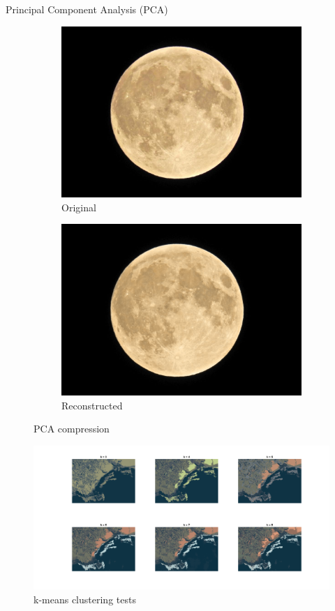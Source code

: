 Principal Component Analysis (PCA)
\begin{figure}[!ht]
    \centering
    \begin{subfigure}{0.45\textwidth}
    \centering
        \includegraphics[width=\linewidth]{Doc/Graphics/Part4/PCA_im_original.png}
        \caption{Original}
    \end{subfigure}
    \begin{subfigure}{0.45\textwidth}
    \centering
        \includegraphics[width=\linewidth]{Doc/Graphics/Part4/PCA_im_reconstructed.png}
        \caption{Reconstructed}
    \end{subfigure}
    \caption{PCA compression}
    \label{fig:enter-label}
\end{figure}

\begin{figure}[!ht]
    \centering
    \includegraphics[width=\linewidth]{Doc/Graphics/Part4/kMeans_comparison.png}
    \caption{k-means clustering tests}
    \label{fig:enter-label}
\end{figure}